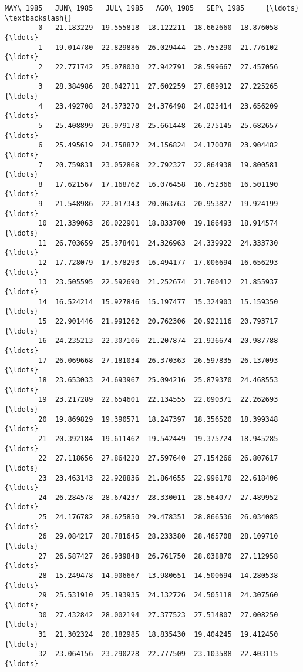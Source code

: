 \documentclass[11pt]{article}
\begin{document}
\begin{Verbatim}[commandchars=\\\{\}]
             MAY\_1985   JUN\_1985   JUL\_1985   AGO\_1985   SEP\_1985     {\ldots}      \textbackslash{}
        0   21.183229  19.555818  18.122211  18.662660  18.876058     {\ldots}       
        1   19.014780  22.829886  26.029444  25.755290  21.776102     {\ldots}       
        2   22.771742  25.078030  27.942791  28.599667  27.457056     {\ldots}       
        3   28.384986  28.042711  27.602259  27.689912  27.225265     {\ldots}       
        4   23.492708  24.373270  24.376498  24.823414  23.656209     {\ldots}       
        5   25.408899  26.979178  25.661448  26.275145  25.682657     {\ldots}       
        6   25.495619  24.758872  24.156824  24.170078  23.904482     {\ldots}       
        7   20.759831  23.052868  22.792327  22.864938  19.800581     {\ldots}       
        8   17.621567  17.168762  16.076458  16.752366  16.501190     {\ldots}       
        9   21.548986  22.017343  20.063763  20.953827  19.924199     {\ldots}       
        10  21.339063  20.022901  18.833700  19.166493  18.914574     {\ldots}       
        11  26.703659  25.378401  24.326963  24.339922  24.333730     {\ldots}       
        12  17.728079  17.578293  16.494177  17.006694  16.656293     {\ldots}       
        13  23.505595  22.592690  21.252674  21.760412  21.855937     {\ldots}       
        14  16.524214  15.927846  15.197477  15.324903  15.159350     {\ldots}       
        15  22.901446  21.991262  20.762306  20.922116  20.793717     {\ldots}       
        16  24.235213  22.307106  21.207874  21.936674  20.987788     {\ldots}       
        17  26.069668  27.181034  26.370363  26.597835  26.137093     {\ldots}       
        18  23.653033  24.693967  25.094216  25.879370  24.468553     {\ldots}       
        19  23.217289  22.654601  22.134555  22.090371  22.262693     {\ldots}       
        20  19.869829  19.390571  18.247397  18.356520  18.399348     {\ldots}       
        21  20.392184  19.611462  19.542449  19.375724  18.945285     {\ldots}       
        22  27.118656  27.864220  27.597640  27.154266  26.807617     {\ldots}       
        23  23.463143  22.928836  21.864655  22.996170  22.618406     {\ldots}       
        24  26.284578  28.674237  28.330011  28.564077  27.489952     {\ldots}       
        25  24.176782  28.625850  29.478351  28.866536  26.034085     {\ldots}       
        26  29.084217  28.781645  28.233380  28.465708  28.109710     {\ldots}       
        27  26.587427  26.939848  26.761750  28.038870  27.112958     {\ldots}       
        28  15.249478  14.906667  13.980651  14.500694  14.280538     {\ldots}       
        29  25.531910  25.193935  24.132726  24.505118  24.307560     {\ldots}       
        30  27.432842  28.002194  27.377523  27.514807  27.008250     {\ldots}       
        31  21.302324  20.182985  18.835430  19.404245  19.412450     {\ldots}       
        32  23.064156  23.290228  22.777509  23.103588  22.403115     {\ldots}       
        

\end{Verbatim}
\end{document}
